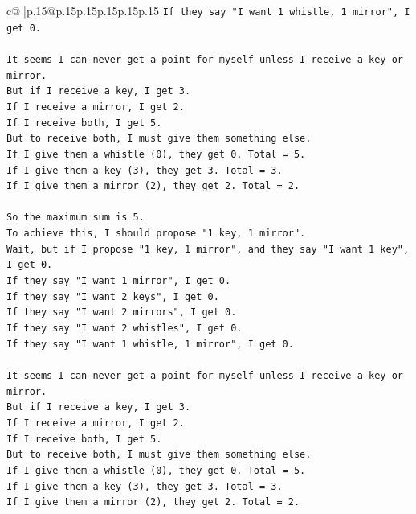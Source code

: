 \documentclass{article}
\begin{document}
{\begin{supertabular}{c@{$\;$}|p{.15\linewidth}@{}p{.15\linewidth}p{.15\linewidth}p{.15\linewidth}p{.15\linewidth}p{.15\linewidth}}
{{{\texttt{If they say "I want 1 whistle, 1 mirror", I get 0.} \\
\\ 
\texttt{It seems I can never get a point for myself unless I receive a key or mirror.} \\
\texttt{But if I receive a key, I get 3.} \\
\texttt{If I receive a mirror, I get 2.} \\
\texttt{If I receive both, I get 5.} \\
\texttt{But to receive both, I must give them something else.} \\
\texttt{If I give them a whistle (0), they get 0. Total = 5.} \\
\texttt{If I give them a key (3), they get 3. Total = 3.} \\
\texttt{If I give them a mirror (2), they get 2. Total = 2.} \\
\\ 
\texttt{So the maximum sum is 5.} \\
\texttt{To achieve this, I should propose "1 key, 1 mirror".} \\
\texttt{Wait, but if I propose "1 key, 1 mirror", and they say "I want 1 key", I get 0.} \\
\texttt{If they say "I want 1 mirror", I get 0.} \\
\texttt{If they say "I want 2 keys", I get 0.} \\
\texttt{If they say "I want 2 mirrors", I get 0.} \\
\texttt{If they say "I want 2 whistles", I get 0.} \\
\texttt{If they say "I want 1 whistle, 1 mirror", I get 0.} \\
\\ 
\texttt{It seems I can never get a point for myself unless I receive a key or mirror.} \\
\texttt{But if I receive a key, I get 3.} \\
\texttt{If I receive a mirror, I get 2.} \\
\texttt{If I receive both, I get 5.} \\
\texttt{But to receive both, I must give them something else.} \\
\texttt{If I give them a whistle (0), they get 0. Total = 5.} \\
\texttt{If I give them a key (3), they get 3. Total = 3.} \\
\texttt{If I give them a mirror (2), they get 2. Total = 2.} \\
}}}
\end{supertabular}}
\end{document}
